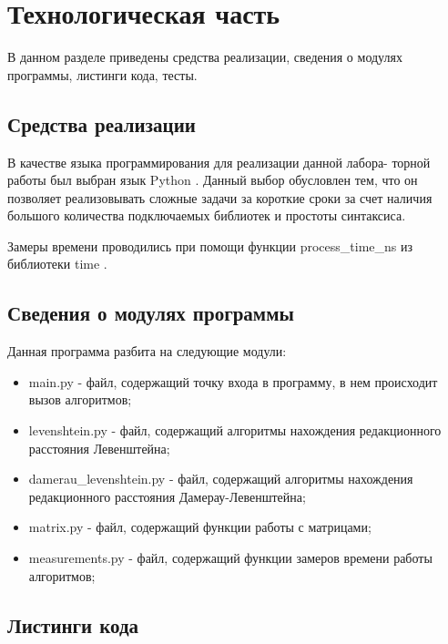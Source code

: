 \chapter{Технологическая часть}

В данном разделе приведены средства реализации, сведения о модулях программы, листинги кода, тесты.

\section{Средства реализации}

В качестве языка программирования для реализации данной лабора-
торной работы был выбран язык Python \cite{python}. Данный выбор обусловлен тем, что он позволяет реализовывать сложные задачи за короткие сроки за счет наличия большого количества подключаемых библиотек и простоты синтаксиса.

Замеры времени проводились при помощи функции process\_time\_ns из библиотеки time \cite{python-time}.

\section{Сведения о модулях программы}

Данная программа разбита на следующие модули:

\begin{itemize}
	\item main.py - файл, содержащий точку входа в программу, в нем происходит вызов алгоритмов;
	\item levenshtein.py - файл, содержащий алгоритмы нахождения редакционного расстояния Левенштейна;
	\item damerau\_levenshtein.py - файл, содержащий алгоритмы нахождения редакционного расстояния Дамерау-Левенштейна;
	\item matrix.py - файл, содержащий функции работы с матрицами;
	\item measurements.py - файл, содержащий функции замеров времени работы алгоритмов;
\end{itemize}

\section{Листинги кода}

